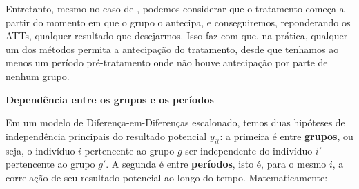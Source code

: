 \documentclass[portugues]{article}
\begin{document}
Entretanto, mesmo no caso de \cite{sun2021estimating}, podemos considerar que o tratamento começa a partir do momento em que o grupo o antecipa, e conseguiremos, reponderando os ATTs, qualquer resultado que desejarmos. Isso faz com que, na prática, qualquer um dos métodos permita a antecipação do tratamento, desde que tenhamos ao menos um período pré-tratamento onde não houve antecipação por parte de nenhum grupo.

\vspace{5mm}

\textbf{Dependência entre os grupos e os períodos}

\vspace{2.5mm}

Em um modelo de Diferença-em-Diferenças escalonado, temos duas hipóteses de independência principais do resultado potencial $y_{it}$: a primeira é entre \textbf{grupos}, ou seja, o indivíduo $i$ pertencente ao grupo $g$ ser independente do indivíduo $i'$ pertencente ao grupo $g'$. A segunda é entre \textbf{períodos}, isto é, para o mesmo $i$, a correlação de seu resultado potencial ao longo do tempo. Matematicamente:
\end{document}
